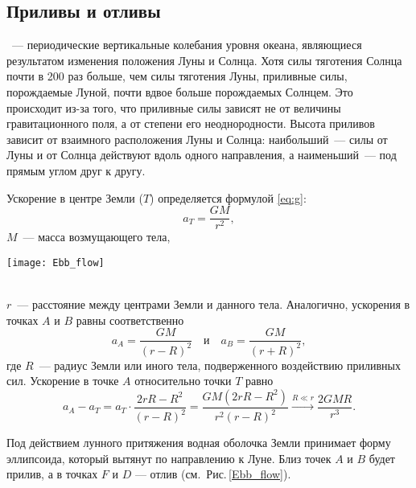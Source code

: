 \subsection{Приливы и отливы}

~--- периодические вертикальные колебания уровня океана, являющиеся результатом изменения положения Луны и Солнца. Хотя силы тяготения Солнца почти в 200 раз больше, чем силы тяготения Луны, приливные силы, порождаемые Луной, почти вдвое больше порождаемых Солнцем. Это происходит из-за того, что приливные силы зависят не от величины гравитационного поля, а от степени его неоднородности. Высота приливов зависит от взаимного расположения Луны и Солнца: наибольший~---  силы от Луны и от Солнца действуют вдоль одного направления, а наименьший~--- под прямым углом друг к другу.

\begin{minipage}{.24\tw}
	Ускорение в центре Земли ($T$) определяется формулой \eqref{eq:g}:
	\begin{equation*}
		a_T=\frac{G M}{r^2},
	\end{equation*}
	$M$~--- масса возмущающего тела,
\end{minipage}
\hfill
\begin{minipage}{0.74\tw}
	\vspace{-.5pc}
	\texttt{[image: Ebb\_flow]}
	\label{Ebb_flow}
\end{minipage}\\[-0.5pc]

$r$~--- расстояние между центрами Земли и данного тела. Аналогично, ускорения в точках $A$ и $B$ равны соответственно
\begin{equation}
	a_A = \frac{G M}{(r - R)^2} \quad \text{и} \quad a_B = \frac{GM}{(r + R)^2},
\end{equation}
где $R$~--- радиус Земли или иного тела, подверженного воздействию приливных сил. Ускорение в точке $A$ относительно точки $T$ равно
\begin{equation}
	a_A - a_T = a_T \cdot \frac{2 r R - R^2}{(r - R)^2} = \frac{GM \left(2 r R - R^2 \right)}{r^2 (r - R)^2} \xrightarrow{R \ll r} \frac{2 G M R}{r^3}.
	\label{eq:ebb-force}
\end{equation}

Под действием лунного притяжения водная оболочка Земли принимает форму
эллипсоида, который вытянут по направлению к Луне. Близ точек $A$ и $B$ будет
прилив, а в точках $F$ и $D$ --- отлив (см.~Рис.\,\ref{Ebb_flow}).
